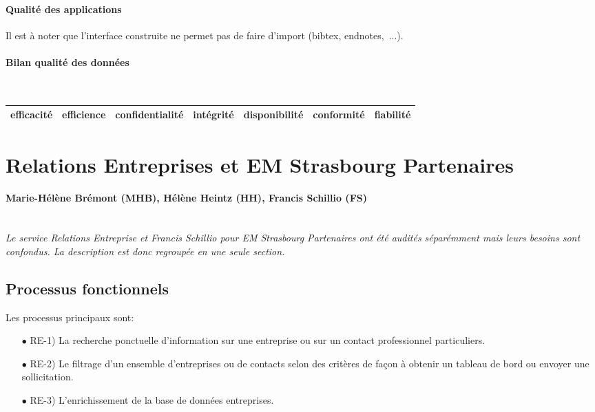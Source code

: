 \documentclass{book}
\begin{document}
\paragraph{Qualité des applications}
Il est à noter que l'interface construite ne permet pas de faire d'import (bibtex, 
endnotes,~...). 

\paragraph{Bilan qualité des données}
~\\


	\begin{tabular}{|l|l|l|l|l|l|l|}
	\hline
	efficacité	& efficience &	confidentialité	& intégrité & disponibilité & conformité & fiabilité \\
	\hline
	
	\hline
	\end{tabular}
	


\section{Relations Entreprises et EM Strasbourg Partenaires}

\paragraph{Marie-Hélène Brémont (MHB), Hélène Heintz (HH), Francis Schillio (FS)}
~\\

\textit{Le service Relations Entreprise et Francis Schillio pour 
EM Strasbourg Partenaires ont été audités séparémment mais leurs 
besoins sont confondus. La description est donc regroupée en une 
seule section.}


\subsection{Processus fonctionnels}

Les processus principaux sont:
\begin{itemize}
\item[$\bullet$] RE-1) La recherche ponctuelle d'information sur une entreprise 
			     ou sur un contact professionnel particuliers.
\item[$\bullet$] RE-2) Le filtrage d'un ensemble d'entreprises ou de contacts
			     selon des critères de façon à obtenir un tableau de bord
			     ou envoyer une sollicitation. 
\item[$\bullet$] RE-3) L'enrichissement de la base de données entreprises.
\end{itemize}
\end{document}
